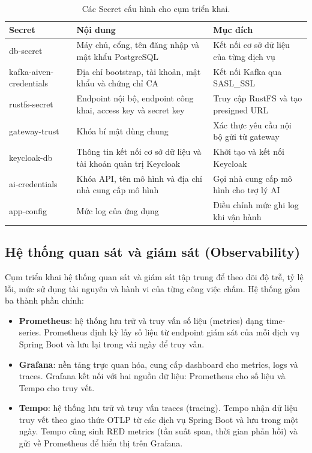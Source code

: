 \documentclass[../BTL.tex]{subfiles}
\begin{document}
\begin{table}[H]
\centering
\small
\begin{tabularx}{\textwidth}{|p{3.6cm}|p{6.2cm}|X|}
\hline
Secret & Nội dung & Mục đích \\ \hline
db-secret & Máy chủ, cổng, tên đăng nhập và mật khẩu PostgreSQL & Kết nối cơ sở dữ liệu của từng dịch vụ \\ \hline
kafka-aiven-credentials & Địa chỉ bootstrap, tài khoản, mật khẩu và chứng chỉ CA & Kết nối Kafka qua SASL\_SSL \\ \hline
rustfs-secret & Endpoint nội bộ, endpoint công khai, access key và secret key & Truy cập RustFS và tạo presigned URL \\ \hline
gateway-trust & Khóa bí mật dùng chung & Xác thực yêu cầu nội bộ gửi từ gateway \\ \hline
keycloak-db & Thông tin kết nối cơ sở dữ liệu và tài khoản quản trị Keycloak & Khởi tạo và kết nối Keycloak \\ \hline
ai-credentials & Khóa API, tên mô hình và địa chỉ nhà cung cấp mô hình & Gọi nhà cung cấp mô hình cho trợ lý AI \\ \hline
app-config & Mức log của ứng dụng & Điều chỉnh mức ghi log khi vận hành \\ \hline
\end{tabularx}
\caption{Các Secret cấu hình cho cụm triển khai.}
\label{tab:deploy-secrets}
\end{table}

\subsection{Hệ thống quan sát và giám sát (Observability)}
\label{section:3.1.6}

Cụm triển khai hệ thống quan sát và giám sát tập trung để theo dõi độ trễ, tỷ lệ lỗi, mức sử dụng tài nguyên và hành vi của từng công việc chấm. Hệ thống gồm ba thành phần chính:

\begin{itemize}
    \item \textbf{Prometheus}: hệ thống lưu trữ và truy vấn số liệu (metrics) dạng time-series. Prometheus định kỳ lấy số liệu từ endpoint giám sát của mỗi dịch vụ Spring Boot và lưu lại trong vài ngày để truy vấn.
    \item \textbf{Grafana}: nền tảng trực quan hóa, cung cấp dashboard cho metrics, logs và traces. Grafana kết nối với hai nguồn dữ liệu: Prometheus cho số liệu và Tempo cho truy vết.
    \item \textbf{Tempo}: hệ thống lưu trữ và truy vấn traces (tracing). Tempo nhận dữ liệu truy vết theo giao thức OTLP từ các dịch vụ Spring Boot và lưu trong một ngày. Tempo cũng sinh RED metrics (tần suất span, thời gian phản hồi) và gửi về Prometheus để hiển thị trên Grafana.
\end{itemize}
\end{document}
